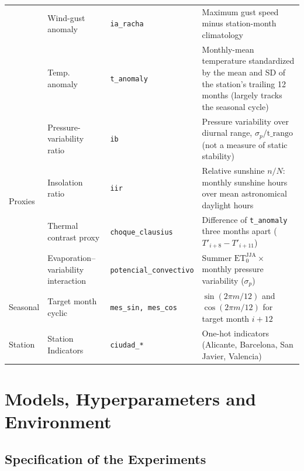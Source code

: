 \documentclass[11pt,a4paper]{article}
\begin{document}
\begin{table}[htbp]
{\begin{tabularx}{\textwidth}{lllX}
& Wind-gust anomaly & \texttt{ia\_racha} & Maximum gust speed minus station-month climatology \\
& Temp. anomaly & \texttt{t\_anomaly} & Monthly-mean temperature standardized by the mean and SD of the station's trailing 12 months (largely tracks the seasonal cycle) \\
\midrule
\multirow{4}{*}{Proxies} & Pressure-variability ratio & \texttt{ib} & Pressure variability over diurnal range, $\sigma_p / \text{t\_rango}$ (not a measure of static stability) \\
& Insolation ratio & \texttt{iir} & Relative sunshine $n/N$: monthly sunshine hours over mean astronomical daylight hours \\
& Thermal contrast proxy & \texttt{choque\_clausius} & Difference of \texttt{t\_anomaly} three months apart ($T'_{i+8} - T'_{i+11}$) \\
& Evaporation--variability interaction & \texttt{potencial\_convectivo} & Summer $\text{ET}_0^{\text{JJA}} \times$ monthly pressure variability ($\sigma_p$) \\
\midrule
Seasonal & Target month cyclic & \texttt{mes\_sin, mes\_cos} & $\sin(2\pi m / 12)$ and $\cos(2\pi m / 12)$ for target month $i+12$ \\
Station & Station Indicators & \texttt{ciudad\_*} & One-hot indicators (Alicante, Barcelona, San Javier, Valencia) \\
\bottomrule
\end{tabularx}%
}
\end{table}



\section{Models, Hyperparameters and Environment}
\label{app:models}

\subsection{Specification of the Experiments}
\label{app:architectures}
\end{document}
